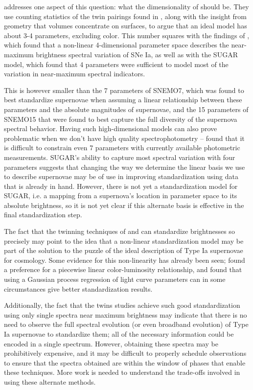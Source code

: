\citet{rubin_constraining_2020} addresses one aspect of this question: what the dimensionality of should be. They use counting statistics of the twin pairings found in \cite{fakhouri_improving_2015}, along with the insight from geometry that volumes concentrate on surfaces, to argue that an ideal model has about 3-4 parameters, excluding color. This number squares with the findings of \citet{boone_twins_2020a}, which found that a non-linear 4-dimensional parameter space describes the near-maximum brightness spectral variation of SNe Ia, as well as with the SUGAR model, which found that 4 parameters were sufficient to model most of the variation in near-maximum spectral indicators.

This is however smaller than the 7 parameters of SNEMO7, which was found to best standardize supernovae when assuming a linear relationship between these parameters and the absolute magnitudes of supernovae, and the 15 parameters of SNEMO15 that were found to best capture the full diversity of the supernova spectral behavior. Having such high-dimensional models can also prove problematic when we don't have high quality spectrophotometry -- \citet{rose_initial_2020} found that it is difficult to constrain even 7 parameters with currently available photometric measurements. SUGAR's ability to capture most spectral variation with four parameters suggests that changing the way we determine the linear basis we use to describe supernovae may be of use in improving standardization using data that is already in hand. However, there is not yet a standardization model for SUGAR, i.e. a mapping from a supernova's location in parameter space to its absolute brightness, so it is not yet clear if this alternate basis is effective in the final standardization step.

The fact that the twinning techniques of \citet{fakhouri_improving_2015} and \citet{boone_twins_2020b} can standardize brightnesses so precisely may point to the idea that a non-linear standardization model may be part of the solution to the puzzle of the ideal description of Type Ia supernovae for cosmology. Some evidence for this non-linearity has already been seen; \citet{rubin_unity_2015} found a preference for a piecewise linear color-luminosity relationship, and \citet{kim_standardizing_2013} found that using a Gaussian process regression of light curve parameters can in some circumstances give better standardization results.

Additionally, the fact that the twins studies achieve such good standardization using only single spectra near maximum brightness may indicate that there is no need to observe the full spectral evolution (or even broadband evolution) of Type Ia supernovae to standardize them; all of the necessary information could be encoded in a single spectrum. However, obtaining these spectra may be prohibitively expensive, and it may be difficult to properly schedule observations to ensure that the spectra obtained are within the window of phases that enable these techniques. More work is needed to understand the trade-offs involved in using these alternate methods.


